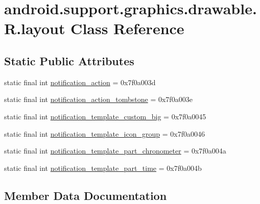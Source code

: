 \hypertarget{classandroid_1_1support_1_1graphics_1_1drawable_1_1R_1_1layout}{}\section{android.\+support.\+graphics.\+drawable.\+R.\+layout Class Reference}
\label{classandroid_1_1support_1_1graphics_1_1drawable_1_1R_1_1layout}
\subsection*{Static Public Attributes}
\begin{DoxyCompactItemize}
\item 
static final int \mbox{\hyperlink{classandroid_1_1support_1_1graphics_1_1drawable_1_1R_1_1layout_a8c635c00891f90c0a7021c4643c79d10}{notification\+\_\+action}} = 0x7f0a003d
\item 
static final int \mbox{\hyperlink{classandroid_1_1support_1_1graphics_1_1drawable_1_1R_1_1layout_a6a02543ca15d3b112916f168117797cf}{notification\+\_\+action\+\_\+tombstone}} = 0x7f0a003e
\item 
static final int \mbox{\hyperlink{classandroid_1_1support_1_1graphics_1_1drawable_1_1R_1_1layout_a915e2f61869cd92504f89d23e8103f8a}{notification\+\_\+template\+\_\+custom\+\_\+big}} = 0x7f0a0045
\item 
static final int \mbox{\hyperlink{classandroid_1_1support_1_1graphics_1_1drawable_1_1R_1_1layout_a20955748ee8168fb8ea82f1147421575}{notification\+\_\+template\+\_\+icon\+\_\+group}} = 0x7f0a0046
\item 
static final int \mbox{\hyperlink{classandroid_1_1support_1_1graphics_1_1drawable_1_1R_1_1layout_ab27345b5d740a94a73736a05f2650143}{notification\+\_\+template\+\_\+part\+\_\+chronometer}} = 0x7f0a004a
\item 
static final int \mbox{\hyperlink{classandroid_1_1support_1_1graphics_1_1drawable_1_1R_1_1layout_a0e956654a5b88f1e4236cf0f3b58eeb6}{notification\+\_\+template\+\_\+part\+\_\+time}} = 0x7f0a004b
\end{DoxyCompactItemize}


\subsection{Member Data Documentation}
\mbox{\label{classandroid_1_1support_1_1graphics_1_1drawable_1_1R_1_1layout_a8c635c00891f90c0a7021c4643c79d10}} 
